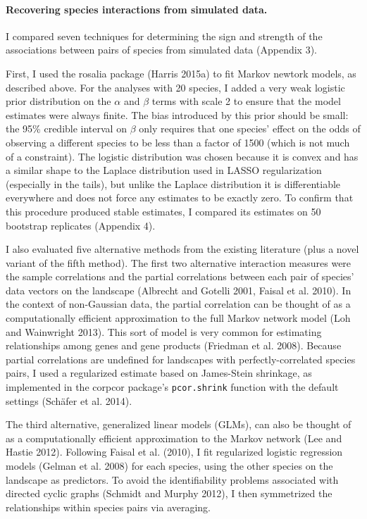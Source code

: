 \documentclass[12pt,]{article}
\begin{document}
\begin{spacing}{1.9}
\begin{flushleft}
\paragraph{Recovering species interactions from simulated
data.}\label{recovering-species-interactions-from-simulated-data.}

I compared seven techniques for determining the sign and strength of the
associations between pairs of species from simulated data (Appendix 3).

First, I used the rosalia package (Harris 2015a) to fit Markov newtork
models, as described above. For the analyses with 20 species, I added a
very weak logistic prior distribution on the \(\alpha\) and \(\beta\)
terms with scale 2 to ensure that the model estimates were always
finite. The bias introduced by this prior should be small: the 95\%
credible interval on \(\beta\) only requires that one species' effect on
the odds of observing a different species to be less than a factor of
1500 (which is not much of a constraint). The logistic distribution was
chosen because it is convex and has a similar shape to the Laplace
distribution used in LASSO regularization (especially in the tails), but
unlike the Laplace distribution it is differentiable everywhere and does
not force any estimates to be exactly zero. To confirm that this
procedure produced stable estimates, I compared its estimates on 50
bootstrap replicates (Appendix 4).

I also evaluated five alternative methods from the existing literature
(plus a novel variant of the fifth method). The first two alternative
interaction measures were the sample correlations and the partial
correlations between each pair of species' data vectors on the landscape
(Albrecht and Gotelli 2001, Faisal et al. 2010). In the context of
non-Gaussian data, the partial correlation can be thought of as a
computationally efficient approximation to the full Markov network model
(Loh and Wainwright 2013). This sort of model is very common for
estimating relationships among genes and gene products (Friedman et al.
2008). Because partial correlations are undefined for landscapes with
perfectly-correlated species pairs, I used a regularized estimate based
on James-Stein shrinkage, as implemented in the corpcor package's
\texttt{pcor.shrink} function with the default settings (Schäfer et al.
2014).

The third alternative, generalized linear models (GLMs), can also be
thought of as a computationally efficient approximation to the Markov
network (Lee and Hastie 2012). Following Faisal et al. (2010), I fit
regularized logistic regression models (Gelman et al. 2008) for each
species, using the other species on the landscape as predictors. To
avoid the identifiability problems associated with directed cyclic
graphs (Schmidt and Murphy 2012), I then symmetrized the relationships
within species pairs via averaging.


\end{flushleft}
\end{spacing}
\end{document}

